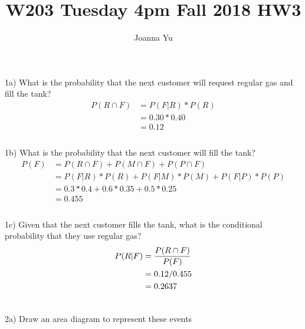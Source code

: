 \documentclass[fleqn]{article}
\title{W203 Tuesday 4pm Fall 2018 HW3}
\author{Joanna Yu}
\begin{document}
\maketitle
1a) What is the probability that the next customer will request regular gas and fill the tank? \\
\begin{equation} \begin{aligned}
P(R \cap F)  &=  P(F|R) * P(R) \\
			  &= 0.30 * 0.40 \\
			  &= 0.12\\	\\
\end{aligned} \end{equation}

1b) What is the probability that the next customer will fill the tank?\\
\begin{equation} \begin{aligned}
P(F) &= P(R \cap F) + P(M \cap F) + P (P \cap F)\\
		&= P(F|R) * P(R) + P(F|M) * P(M) + P(F|P) * P(P)\\
		&=0.3*0.4 + 0.6*0.35 + 0.5*0.25\\
		&=0.455\\ \\
\end{aligned} \end{equation}

1c) Given that the next customer fills the tank, what is the conditional probability that they use regular gas?\\
\begin{equation} \begin{aligned}
P(R|F) &= {P(R \cap F) \over P(F)}\\
		&= 0.12/0.455\\
		&=0.2637\\ \\ 
\end{aligned} \end{equation}

2a) Draw an area diagram to represent these events\\ \\ \\ \\ \\ \\ \\ \\ \\ \\ \\ \\  \\ \\
\end{document}
